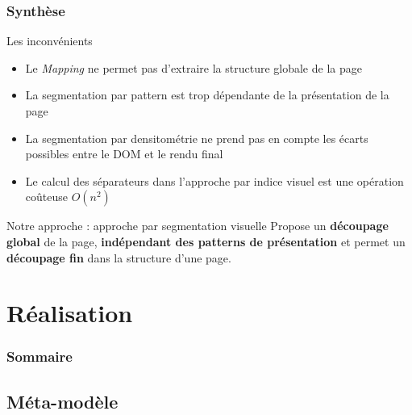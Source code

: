 \documentclass[9pt]{beamer}
\begin{document}
\begin{frame}
\frametitle{Synthèse}
\begin{block}{Les inconvénients}
	\begin{itemize}
		\item Le \emph{Mapping} ne permet pas d'extraire la structure globale de la page
		\item La segmentation par pattern est trop dépendante de la présentation de la page
		\item La segmentation par densitométrie ne prend pas en compte les écarts possibles entre le DOM et le rendu final
		\item Le calcul des séparateurs dans l'approche par indice visuel est une opération coûteuse $O(n^2)$
	\end{itemize}
\end{block}
\begin{block}{Notre approche : approche par segmentation visuelle}
Propose un \textbf{découpage global} de la page, \textbf{indépendant des patterns de présentation} et permet un \textbf{découpage fin} dans la structure d'une page.
\end{block}
\end{frame}

\section{Réalisation}
\begin{frame}
  \frametitle{Sommaire}
\end{frame}

\subsection{Méta-modèle}
\end{document}
